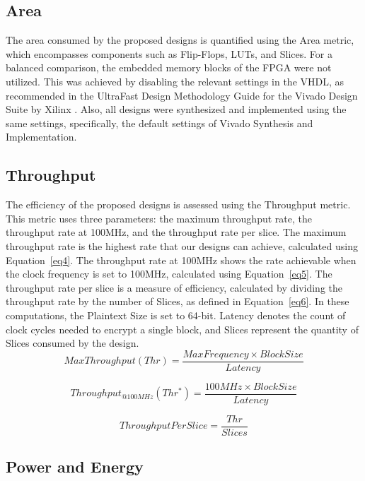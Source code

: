 \documentclass[final,5p,times,twocolumn]{elsarticle}
\begin{document}
\subsection{Area}\label{subsec5}

The area consumed by the proposed designs is quantified using the Area metric, which encompasses components such as Flip-Flops, LUTs, and Slices.
For a balanced comparison, the embedded memory blocks of the FPGA were not utilized.
This was achieved by disabling the relevant settings in the VHDL, as recommended in the UltraFast Design Methodology Guide for the Vivado Design Suite by Xilinx \cite{xilinx2022ultrafast}.
Also, all designs were synthesized and implemented using the same settings, specifically, the default settings of Vivado Synthesis and Implementation.

\subsection{Throughput}\label{subsec6}
The efficiency of the proposed designs is assessed using the Throughput metric.
This metric uses three parameters: the maximum throughput rate, the throughput rate at 100MHz, and the throughput rate per slice.
The maximum throughput rate is the highest rate that our designs can achieve, calculated using Equation~\ref{eq4}.
The throughput rate at 100MHz shows the rate achievable when the clock frequency is set to 100MHz, calculated using Equation~\ref{eq5}.
The throughput rate per slice is a measure of efficiency, calculated by dividing the throughput rate by the number of Slices, as defined in Equation~\ref{eq6}.
In these computations, the Plaintext Size is set to 64-bit. 
Latency denotes the count of clock cycles needed to encrypt a single block, and Slices represent the quantity of Slices consumed by the design.
\begin{equation}
    MaxThroughput(Thr) = \frac{MaxFrequency \times Block Size}{Latency}
    \label{eq4}
\end{equation}

\begin{equation}
    Throughput_{@100MHz}(Thr^*) = \frac{100MHz \times Block Size}{Latency}
    \label{eq5}
\end{equation}

\begin{equation}
    ThroughputPerSlice = \frac{Thr}{Slices}
    \label{eq6}
\end{equation}

\subsection{Power and Energy}\label{power_energy}
\end{document}
